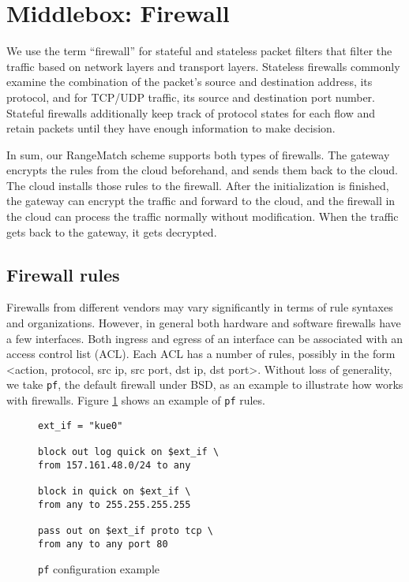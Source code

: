 


\section{Middlebox: Firewall}\label{sec:firewall}


We use the term ``firewall'' for stateful and stateless packet filters that filter the traffic based on network layers and transport layers. Stateless firewalls commonly examine the combination of the packet's source and destination address, its protocol, and for TCP/UDP traffic, its source and destination port number. Stateful firewalls additionally keep track of protocol states for each flow and retain packets until they have enough information to make decision. 

In sum, our RangeMatch scheme supports both types of firewalls. The gateway encrypts the rules from the cloud beforehand, and sends them back to the cloud. The cloud installs those rules to the firewall. After the initialization is finished, the gateway can encrypt the traffic and forward to the cloud, and the firewall in the cloud can process the traffic normally without modification. When the traffic gets back to the gateway, it gets decrypted.

\subsection{Firewall rules}
Firewalls from different vendors may vary significantly in terms of rule syntaxes and organizations. However,
in general both hardware and software firewalls have a few interfaces. Both ingress and egress of an interface 
can be associated with an access control list (ACL). Each ACL has a number of rules, possibly in the form 
<action, protocol, src ip, src port, dst ip, dst port>. Without loss of generality, we take \texttt{pf}, the 
default firewall under BSD, as an example to illustrate how \sys works with firewalls. Figure \ref{fig:fwrule1} 
shows an example of \texttt{pf} rules. 

\begin{figure}[h]\label{fig:fwrule1}
\begin{lstlisting}[frame=single]
ext_if = "kue0"

block out log quick on $ext_if \
from 157.161.48.0/24 to any

block in quick on $ext_if \
from any to 255.255.255.255

pass out on $ext_if proto tcp \
from any to any port 80
\end{lstlisting}
\caption{\texttt{pf} configuration example}
\end{figure}

